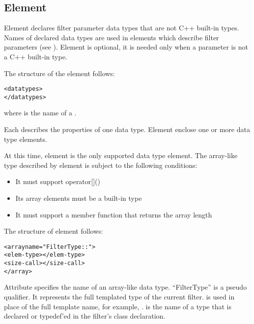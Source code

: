 \subsection{Element }

Element  declares filter parameter data types
that are not C++ built-in  types.  Names of declared data types are
used in  elements which  describe filter
parameters (see ).  Element
 is optional, it is needed only when a
parameter is not a C++ built-in type.

The structure of the  element follows:

\begin{alltt}
  <datatypes>
    \velide
    \velide  
  </datatypes>
\end{alltt}

where  is the name of a .  

Each 
describes the properties of one data type.  Element
 enclose one or more data type elements.

At this time, element  is the only supported data
type element.  The array-like type described by element
 is subject to the following conditions:

\begin{itemize}
\item It must support operator[]()
\item Its array elements must be a built-in type
\item It must support a member function that returns the array length
\end{itemize}

The structure of element  follows:

\begin{alltt}
  <array name="FilterType::">
    <elem-type></elem-type>
    <size-call></size-call>
  </array>
\end{alltt}

Attribute  specifies the name of an array-like
data type.  ``FilterType'' is a pseudo qualifier.  It represents the
full templated type of the current filter.   is
used in place of the full template name, for example, 
.
 is the name of a type that is declared or
typedef'ed in the filter's class declaration.

